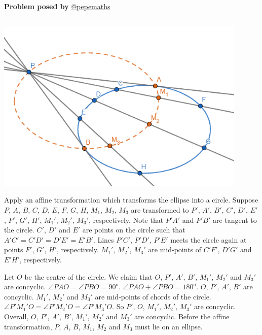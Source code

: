 \documentclass[12pt]{article}
\begin{document}
\begin{flushright}
\textbf{Problem posed by}
\textcolor{RoyalBlue2}{\href{https://www.instagram.com/pepemaths/}{@pepemaths}}
\end{flushright}


\subsection*{}
\begin{center}
    \includegraphics[width = 12cm]{Figure1.3.png}
\end{center}
Apply an affine transformation which transforms the ellipse into a circle. Suppose $P$, $A$, $B$, $C$, $D$, $E$, $F$, $G$, $H$, $M_1$, $M_2$, $M_3$ are transformed to $P'$, $A'$, $B'$, $C'$, $D'$, $E'$, $F'$, $G'$, $H'$, $M_1 '$, $M_2 '$, $M_3 '$, respectively. Note that $P'A'$ and $P'B'$ are tangent to the circle. $C'$, $D'$ and $E'$ are points on the circle such that $A'C'=C'D'=D'E'=E'B'$. Lines $P'C'$, $P'D'$, $P'E'$ meets the circle again at points $F'$, $G'$, $H'$, respectively. $M_1 '$, $M_2 '$, $M_3 '$ are mid-points of $C'F'$, $D'G'$ and $E'H'$, respectively.

Let $O$ be the centre of the circle. We claim that $O$, $P'$, $A'$, $B'$, $M_1 '$, $M_2 '$ and $M_3 '$ are concyclic. $\angle PAO=\angle PBO = 90^o$. $\angle PAO+\angle PBO = 180^o$. $O$, $P'$, $A'$, $B'$ are concyclic. $M_1 '$, $M_2 '$ and $M_3 '$ are mid-points of chords of the circle. $\angle P'M_1 'O=\angle P'M_2 'O=\angle P'M_3 'O$. So  $P'$, $O$, $M_1 '$, $M_2 '$, $M_3 '$ are concyclic. Overall,  $O$, $P'$, $A'$, $B'$, $M_1 '$, $M_2 '$ and $M_3 '$ are concyclic. Before the affine transformation,  $P$, $A$, $B$, $M_1$, $M_2$ and $M_3$ must lie on an ellipse.
\end{document}
